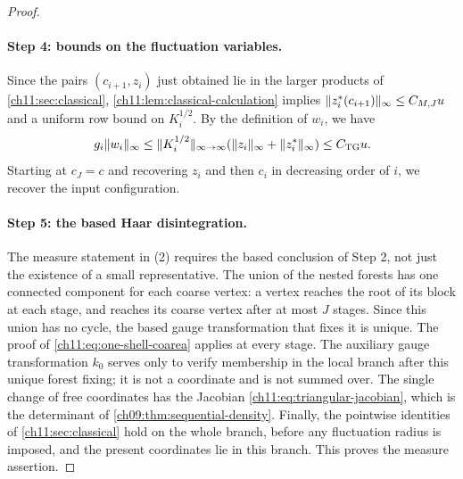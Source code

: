 \begin{proof}
\paragraph{Step 4: bounds on the fluctuation variables.}
Since the pairs $(c_{i+1},z_i)$ just obtained lie in the larger products of \cref{ch11:sec:classical}, \cref{ch11:lem:classical-calculation} implies $\lVert z_i^*(c_{i+1})\rVert_\infty\le C_{M,J}u$ and a uniform row bound on $K_i^{1/2}$. By the definition of $w_i$, we have
\[
 g_i\lVert w_i\rVert_\infty\le\lVert K_i^{1/2}\rVert_{\infty\to\infty}(\lVert z_i\rVert_\infty+\lVert z_i^*\rVert_\infty)\le C_{\mathrm{TG}}u.
\]
Starting at $c_J=c$ and recovering $z_i$ and then $c_i$ in decreasing order of $i$, we recover the input configuration.

\paragraph{Step 5: the based Haar disintegration.}
The measure statement in (2) requires the based conclusion of Step 2, not just the existence of a small representative. The union of the nested forests has one connected component for each coarse vertex: a vertex reaches the root of its block at each stage, and reaches its coarse vertex after at most $J$ stages. Since this union has no cycle, the based gauge transformation that fixes it is unique. The proof of \eqref{ch11:eq:one-shell-coarea} applies at every stage. The auxiliary gauge transformation $k_0$ serves only to verify membership in the local branch after this unique forest fixing; it is not a coordinate and is not summed over. The single change of free coordinates has the Jacobian \eqref{ch11:eq:triangular-jacobian}, which is the determinant of \cref{ch09:thm:sequential-density}. Finally, the pointwise identities of \cref{ch11:sec:classical} hold on the whole branch, before any fluctuation radius is imposed, and the present coordinates lie in this branch. This proves the measure assertion.


\end{proof}
